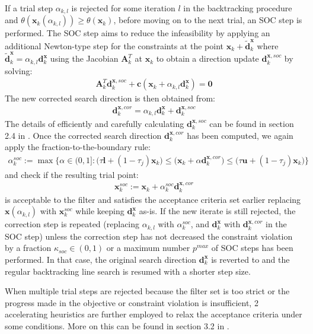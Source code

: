   If a trial step $\alpha_{k,l}$ is rejected for some iteration $l$ in the backtracking procedure and $\theta(\bm{x}_k(\alpha_{k,l})) \geq \theta(\bm{x}_k)$, before moving on to the next trial, an SOC step is performed. The SOC step aims to reduce the infeasibility by applying an additional Newton-type step for the constraints at the point $\bm{x}_k + \tilde{\bm{d}}_k^{\bm{x}}$ where $\tilde{\bm{d}}_k^{\bm{x}} = \alpha_{k,l} \bm{d}_k^{\bm{x}}$ using the Jacobian $\bm{A}_k^T$ at $\bm{x}_k$ to obtain a direction update $\bm{d}_k^{\bm{x},soc}$ by solving:
  \begin{align}
      \bm{A}_k^T \bm{d}_k^{\bm{x},soc} + \bm{c}(\bm{x}_k + \alpha_{k,l} \bm{d}_k^{\bm{x}}) = \bm{0}
  \end{align}
  The new corrected search direction is then obtained from:
  \begin{align}
      \bm{d}_k^{\bm{x},cor} = \alpha_{k,l} \bm{d}_k^{\bm{x}} + \bm{d}_k^{\bm{x},soc}
  \end{align}
  The details of efficiently and carefully calculating $\bm{d}_k^{\bm{x},soc}$ can be found in section 2.4 in \cite{Wachter2006}. Once the corrected search direction $\bm{d}_k^{\bm{x},cor}$ has been computed, we again apply the fraction-to-the-boundary rule:
  \begin{align}
      \alpha_{k}^{soc} := \max \Bigg\{ \alpha \in (0, 1] : \Big( \tau \bm{l} + (1 - \tau_j) \bm{x}_k \Big) \leq \Big( \bm{x}_k + \alpha \bm{d}_k^{\bm{x}, cor} \Big) \leq \Big( \tau \bm{u} + (1 - \tau_j) \bm{x}_k \Big) \Bigg\}
  \end{align}
  and check if the resulting trial point:
  \begin{align}
      \bm{x}_k^{soc} := \bm{x}_k + \alpha_k^{soc} \bm{d}_k^{\bm{x}, cor}
  \end{align}
  is acceptable to the filter and satisfies the acceptance criteria set earlier replacing $\bm{x}(\alpha_{k,l})$ with $\bm{x}_k^{soc}$ while keeping $\bm{d}_k^{\bm{x}}$ as-is. If the new iterate is still rejected, the correction step is repeated (replacing $\alpha_{k,l}$ with $\alpha_k^{soc}$, and $\bm{d}_k^{\bm{x}}$ with $\bm{d}_k^{\bm{x}, cor}$ in the SOC step) unless the correction step has not decreased the constraint violation by a fraction $\kappa_{soc} \in (0, 1)$ or a maximum number $p^{max}$ of SOC steps has been performed. In that case, the original search direction $\bm{d}_k^{\bm{x}}$ is reverted to and the regular backtracking line search is resumed with a shorter step size.
  
  When multiple trial steps are rejected because the filter set is too strict or the progress made in the objective or constraint violation is insufficient, 2 accelerating heuristics are further employed to relax the acceptance criteria under some conditions. More on this can be found in section 3.2 in \cite{Wachter2006}.
  
